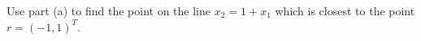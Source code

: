 Use part (a) to find the point on the line $x_2 = 1 + x_1$ which is closest to the point $r = (-1, 1)^T$.

\begin{solution}
    \ \\
    \vfill
\end{solution}